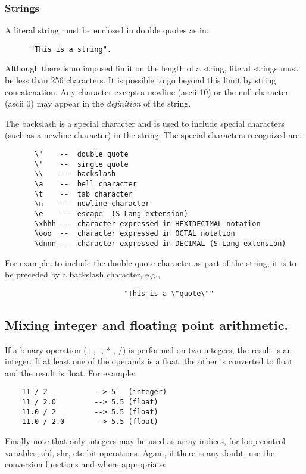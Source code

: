       
\subsubsection{Strings}
    
    A literal string must be enclosed in double quotes as in:
\begin{verbatim}
      "This is a string".
\end{verbatim}
    Although there is no imposed limit on the length of a string, literal
    strings must be less than 256 characters.  It is possible to go beyond
    this limit by string concatenation.  Any character except a newline
    (ascii 10) or the null character (ascii 0) may appear in the {\em
    definition} of the string.

    The backslash is a special character and is used to include special
    characters (such as a newline character) in the string. The special
    characters recognized are:
\begin{verbatim}
       \"    --  double quote
       \'    --  single quote
       \\    --  backslash
       \a    --  bell character
       \t    --  tab character
       \n    --  newline character
       \e    --  escape  (S-Lang extension)
       \xhhh --  character expressed in HEXIDECIMAL notation
       \ooo  --  character expressed in OCTAL notation
       \dnnn --  character expressed in DECIMAL (S-Lang extension)
\end{verbatim}
    For example, to include the double quote character as part of the
    string, it is to be preceded by a backslash character, e.g.,
\begin{verbatim}
                            "This is a \"quote\""
\end{verbatim}

\subsection{Mixing integer and floating point arithmetic.}

   If a binary operation (+, -, * , /) is performed on two integers, the
   result is an integer.  If at least one of the operands is a float, the
   other is converted to float and the result is float.  For example:

\begin{verbatim}
    11 / 2           --> 5   (integer)
    11 / 2.0         --> 5.5 (float)
    11.0 / 2         --> 5.5 (float)
    11.0 / 2.0       --> 5.5 (float)
\end{verbatim}
   Finally note that only integers may be used as array indices, for loop
   control variables, shl, shr, etc bit operations.  Again, if there is any
   doubt, use the conversion functions  and  where appropriate:

